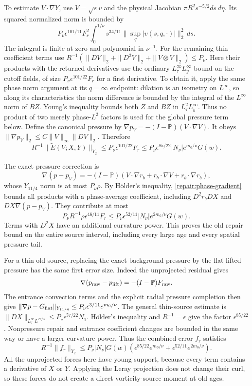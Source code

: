 To estimate $V\cdot\nabla Y$, use $V=\sqrt{s}v$ and the physical
Jacobian $\pi R^2s^{-5/2}ds\,d\eta$. Its squared normalized norm
is bounded by
\[
 P_\nu\epsilon^{101/11}F_r^2
 \int_0^{1/\nu}s^{34/11}
             \|\sup_q|v(s,q,\cdot)|\|_2^2\,ds.
\]
The integral is finite at zero and polynomial in $\nu^{-1}$.
For the remaining thin-coefficient terms use
$R^{-1}(\|DV\|_2+\|D^2V\|_2+\|V\otimes V\|_2)\le P_\nu$.
Here their products with the returned derivatives use the ordinary
$L^\infty_\tau L^\infty_y$ bound on the cutoff fields, of size
$P_\nu\epsilon^{101/22}F_r$ for a first derivative. To obtain it,
apply the same phase norm argument at its $q=\infty$ endpoint:
dilation is an isometry on $L^\infty$, so along its characteristics
the norm difference is bounded by the integral of the $L^\infty$
norm of $BZ$. Young's inequality bounds both $Z$ and $BZ$ in
$L^2_\tau L^\infty_y$. Thus no product of two merely phase-$L^2$
factors is used for the global pressure term below.
Define the canonical pressure by
$\nabla p_V=-(I-\mathbb P)(V\cdot\nabla V)$. It obeys
$\|\nabla p_V\|_2\le C\|V\|_\infty\|DV\|_2$.
Therefore
\[
 R^{-1}\|\widetilde E(V;X,Y)\|_{Y_2}
 \le P_\nu\epsilon^{101/22}F_r
 \le P_\nu\epsilon^{85/22}|N_\nu|e^{m_0/\nu}G(w).
\]

The exact pressure correction is
\[
 \nabla(p-p_V)=-(I-\mathbb P)
 (V\cdot\nabla r_b+r_b\cdot\nabla V+r_b\cdot\nabla r_b),
\]
whose $Y_{11/4}$ norm is at most $P_\nu\rho$.
By H\"older's inequality, \eqref{repair:phase-gradient} bounds all
products with a phase-average coefficient, including
$D^2r_bDX$ and $DX\nabla(p-p_V)$. They contribute at most
\[
 P_\nu R^{-1}\rho\epsilon^{46/11}F_r
 \le P_\nu\epsilon^{52/11}|N_\nu|e^{2m_0/\nu}G(w).
\]
Terms with $D^2X$ have an additional curvature power. This proves
the old repair bound on the entire source interval, including every
large age and every spatial pressure tail.

For a thin old source, replacing the exact background pressure by
the flat lifted pressure has the same first error size. Indeed the
unprojected residual gives
\[
 \nabla(p_{\rm raw}-p_{\rm lift})
       =-(I-\mathbb P)F_{\rm raw}.
\]
The entrance convection terms and the explicit radial pressure
completion then give
$\|\nabla p-G_{\rm flat}\|_{Y_{11/4}}
 \le P_\nu\epsilon^{3/11}e^{m_0/\nu}$.
The general thin-source estimate is
$\|DX\|_{L^\infty_\tau L^{22/3}}
 \le P_\nu\epsilon^{57/22}N_1$.
H\"older's inequality and $R^{-1}=\epsilon$ give the factor
$\epsilon^{85/22}$. Nonpressure repair and entrance
coefficient changes are bounded in the same way or have a larger
curvature power. Thus the combined error $f_r$ satisfies
\begin{equation}\label{repair:body-error}
 R^{-1}\|f_r\|_{Y_2}
 \le P_\nu |N_\nu|G(w)
 \left(\epsilon^{85/22}e^{m_0/\nu}
       +\epsilon^{52/11}e^{2m_0/\nu}\right).
\end{equation}
All the unprojected forces here have young support, because every
term contains a derivative of $X$ or $Y$. Applying the Leray
projection does not change their curl, so these forces do not create
a direct vorticity-source moment at old ages.

